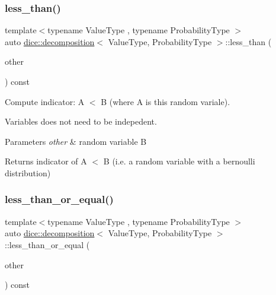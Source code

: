 \subsubsection{\texorpdfstring{less\+\_\+than()}{less\_than()}}
{\footnotesize\ttfamily template$<$typename Value\+Type , typename Probability\+Type $>$ \\
auto \mbox{\hyperlink{classdice_1_1decomposition}{dice\+::decomposition}}$<$ Value\+Type, Probability\+Type $>$\+::less\+\_\+than (\begin{DoxyParamCaption}\item[{const \mbox{\hyperlink{classdice_1_1decomposition}{decomposition}}$<$ Value\+Type, Probability\+Type $>$ \&}]{other }\end{DoxyParamCaption}) const\hspace{0.3cm}{\ttfamily [inline]}}



Compute indicator\+: A $<$ B (where A is this random variale). 

Variables does not need to be indepedent.


\begin{DoxyParams}{Parameters}
{\em other} & random variable B\\
\hline
\end{DoxyParams}
\begin{DoxyReturn}{Returns}
indicator of A $<$ B (i.\+e. a random variable with a bernoulli distribution) 
\end{DoxyReturn}
\mbox{\label{classdice_1_1decomposition_a64f50038f58aafaba4c328dc07dae9ba}} 
\subsubsection{\texorpdfstring{less\+\_\+than\+\_\+or\+\_\+equal()}{less\_than\_or\_equal()}}
{\footnotesize\ttfamily template$<$typename Value\+Type , typename Probability\+Type $>$ \\
auto \mbox{\hyperlink{classdice_1_1decomposition}{dice\+::decomposition}}$<$ Value\+Type, Probability\+Type $>$\+::less\+\_\+than\+\_\+or\+\_\+equal (\begin{DoxyParamCaption}\item[{const \mbox{\hyperlink{classdice_1_1decomposition}{decomposition}}$<$ Value\+Type, Probability\+Type $>$ \&}]{other }\end{DoxyParamCaption}) const\hspace{0.3cm}{\ttfamily [inline]}}



